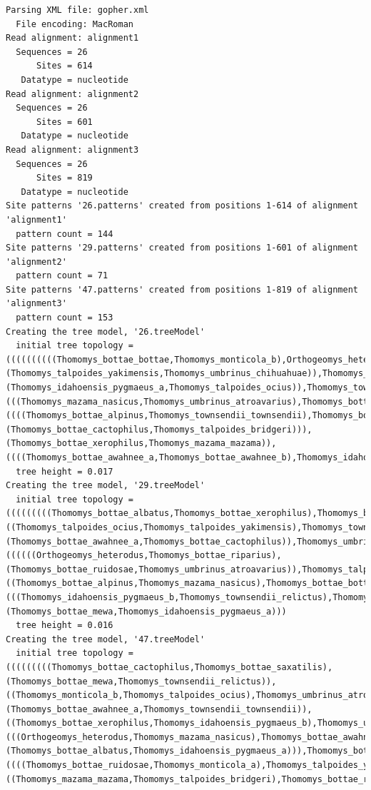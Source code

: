 \documentclass[12pt]{article}
\begin{document}
{\begin{verbatim}
Parsing XML file: gopher.xml
  File encoding: MacRoman
Read alignment: alignment1
  Sequences = 26
      Sites = 614
   Datatype = nucleotide
Read alignment: alignment2
  Sequences = 26
      Sites = 601
   Datatype = nucleotide
Read alignment: alignment3
  Sequences = 26
      Sites = 819
   Datatype = nucleotide
Site patterns '26.patterns' created from positions 1-614 of alignment 'alignment1'
  pattern count = 144
Site patterns '29.patterns' created from positions 1-601 of alignment 'alignment2'
  pattern count = 71
Site patterns '47.patterns' created from positions 1-819 of alignment 'alignment3'
  pattern count = 153
Creating the tree model, '26.treeModel'
  initial tree topology = ((((((((((Thomomys_bottae_bottae,Thomomys_monticola_b),Orthogeomys_heterodus),(Thomomys_talpoides_yakimensis,Thomomys_umbrinus_chihuahuae)),Thomomys_bottae_saxatilis),(Thomomys_idahoensis_pygmaeus_a,Thomomys_talpoides_ocius)),Thomomys_townsendii_relictus),(((Thomomys_mazama_nasicus,Thomomys_umbrinus_atroavarius),Thomomys_bottae_laticeps),Thomomys_monticola_a)),((((Thomomys_bottae_alpinus,Thomomys_townsendii_townsendii),Thomomys_bottae_ruidosae),Thomomys_bottae_mewa),(Thomomys_bottae_cactophilus,Thomomys_talpoides_bridgeri))),(Thomomys_bottae_xerophilus,Thomomys_mazama_mazama)),((((Thomomys_bottae_awahnee_a,Thomomys_bottae_awahnee_b),Thomomys_idahoensis_pygmaeus_b),Thomomys_bottae_albatus),Thomomys_bottae_riparius))
  tree height = 0.017
Creating the tree model, '29.treeModel'
  initial tree topology = (((((((((Thomomys_bottae_albatus,Thomomys_bottae_xerophilus),Thomomys_bottae_saxatilis),Thomomys_monticola_a),((Thomomys_talpoides_ocius,Thomomys_talpoides_yakimensis),Thomomys_townsendii_townsendii)),(Thomomys_bottae_awahnee_a,Thomomys_bottae_cactophilus)),Thomomys_umbrinus_chihuahuae),Thomomys_mazama_mazama),((((((Orthogeomys_heterodus,Thomomys_bottae_riparius),(Thomomys_bottae_ruidosae,Thomomys_umbrinus_atroavarius)),Thomomys_talpoides_bridgeri),Thomomys_monticola_b),Thomomys_bottae_laticeps),((Thomomys_bottae_alpinus,Thomomys_mazama_nasicus),Thomomys_bottae_bottae))),(((Thomomys_idahoensis_pygmaeus_b,Thomomys_townsendii_relictus),Thomomys_bottae_awahnee_b),(Thomomys_bottae_mewa,Thomomys_idahoensis_pygmaeus_a)))
  tree height = 0.016
Creating the tree model, '47.treeModel'
  initial tree topology = (((((((((Thomomys_bottae_cactophilus,Thomomys_bottae_saxatilis),(Thomomys_bottae_mewa,Thomomys_townsendii_relictus)),((Thomomys_monticola_b,Thomomys_talpoides_ocius),Thomomys_umbrinus_atroavarius)),Thomomys_bottae_laticeps),(Thomomys_bottae_awahnee_a,Thomomys_townsendii_townsendii)),((Thomomys_bottae_xerophilus,Thomomys_idahoensis_pygmaeus_b),Thomomys_umbrinus_chihuahuae)),(((Orthogeomys_heterodus,Thomomys_mazama_nasicus),Thomomys_bottae_awahnee_b),(Thomomys_bottae_albatus,Thomomys_idahoensis_pygmaeus_a))),Thomomys_bottae_bottae),((((Thomomys_bottae_ruidosae,Thomomys_monticola_a),Thomomys_talpoides_yakimensis),Thomomys_bottae_alpinus),((Thomomys_mazama_mazama,Thomomys_talpoides_bridgeri),Thomomys_bottae_riparius)))

\end{verbatim}}
\end{document}
